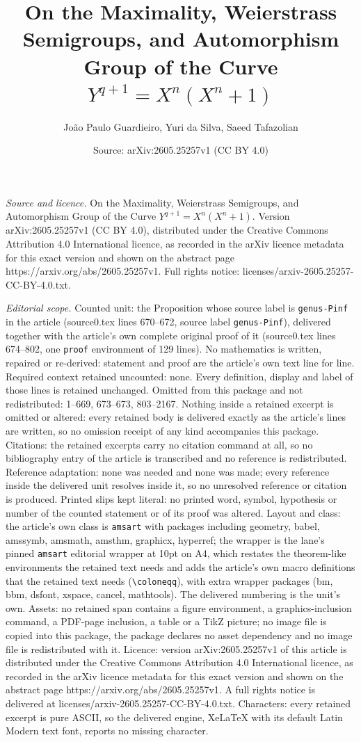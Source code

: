 \documentclass[10pt,a4paper]{amsart}
\title[On the Maximality, Weierstrass Semigroups, and Automorphism ]{On the Maximality, Weierstrass Semigroups, and Automorphism Group of the Curve $Y^{q+1} = X^n(X^n + 1)$}
\author{Jo\~ao Paulo Guardieiro, Yuri da Silva, Saeed Tafazolian}
\date{Source: arXiv:2605.25257v1 (CC BY 4.0)}
\begin{document}
\maketitle

\noindent\emph{Source and licence.} On the Maximality, Weierstrass Semigroups, and Automorphism Group of the Curve $Y^{q+1} = X^n(X^n + 1)$. Version arXiv:2605.25257v1 (CC BY 4.0), distributed under the Creative Commons Attribution 4.0 International licence, as recorded in the arXiv licence metadata for this exact version and shown on the abstract page https://arxiv.org/abs/2605.25257v1. Full rights notice: licenses/arxiv-2605.25257-CC-BY-4.0.txt.\par\smallskip

\noindent\textit{Editorial scope.} Counted unit: the Proposition whose source label is \texttt{genus-Pinf} in the article (source0.tex lines 670--672, source label \texttt{genus-Pinf}), delivered together with the article's own complete original proof of it (source0.tex lines 674--802, one \texttt{proof} environment of 129 lines). No mathematics is written, repaired or re-derived: statement and proof are the article's own text line for line. Required context retained uncounted: none. Every definition, display and label of those lines is retained unchanged. Omitted from this package and not redistributed: 1--669, 673--673, 803--2167. Nothing inside a retained excerpt is omitted or altered: every retained body is delivered exactly as the article's lines are written, so no omission receipt of any kind accompanies this package. Citations: the retained excerpts carry no citation command at all, so no bibliography entry of the article is transcribed and no reference is redistributed. Reference adaptation: none was needed and none was made; every reference inside the delivered unit resolves inside it, so no unresolved reference or citation is produced. Printed slips kept literal: no printed word, symbol, hypothesis or number of the counted statement or of its proof was altered. Layout and class: the article's own class is \texttt{amsart} with packages including geometry, babel, amssymb, amsmath, amsthm, graphicx, hyperref; the wrapper is the lane's pinned \texttt{amsart} editorial wrapper at 10pt on A4, which restates the theorem-like environments the retained text needs and adds the article's own macro definitions that the retained text needs (\texttt{\textbackslash coloneqq}), with extra wrapper packages (bm, bbm, dsfont, xspace, cancel, mathtools). The delivered numbering is the unit's own. Assets: no retained span contains a figure environment, a graphics-inclusion command, a PDF-page inclusion, a table or a TikZ picture; no image file is copied into this package, the package declares no asset dependency and no image file is redistributed with it. Licence: version arXiv:2605.25257v1 of this article is distributed under the Creative Commons Attribution 4.0 International licence, as recorded in the arXiv licence metadata for this exact version and shown on the abstract page https://arxiv.org/abs/2605.25257v1. A full rights notice is delivered at licenses/arxiv-2605.25257-CC-BY-4.0.txt. Characters: every retained excerpt is pure ASCII, so the delivered engine, XeLaTeX with its default Latin Modern text font, reports no missing character.
\end{document}
